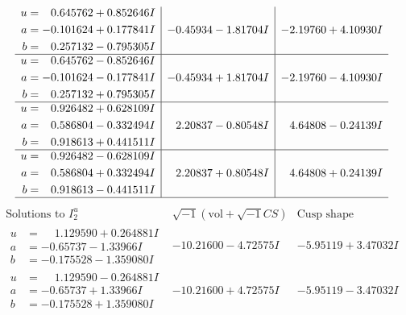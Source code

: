 \documentclass[1p]{elsarticle_modified}
\theoremstyle{definition}
\newcommand{\I}{\sqrt{-1}}
\begin{document}
$$\begin{array}{c|c|c}
\begin{aligned}
u &= \phantom{-}0.645762 + 0.852646 I \\
a &= -0.101624 + 0.177841 I \\
b &= \phantom{-}0.257132 - 0.795305 I\end{aligned}
 & -0.45934 - 1.81704 I & -2.19760 + 4.10930 I \\ \hline\begin{aligned}
u &= \phantom{-}0.645762 - 0.852646 I \\
a &= -0.101624 - 0.177841 I \\
b &= \phantom{-}0.257132 + 0.795305 I\end{aligned}
 & -0.45934 + 1.81704 I & -2.19760 - 4.10930 I \\ \hline\begin{aligned}
u &= \phantom{-}0.926482 + 0.628109 I \\
a &= \phantom{-}0.586804 - 0.332494 I \\
b &= \phantom{-}0.918613 + 0.441511 I\end{aligned}
 & \phantom{-}2.20837 - 0.80548 I & \phantom{-}4.64808 - 0.24139 I \\ \hline\begin{aligned}
u &= \phantom{-}0.926482 - 0.628109 I \\
a &= \phantom{-}0.586804 + 0.332494 I \\
b &= \phantom{-}0.918613 - 0.441511 I\end{aligned}
 & \phantom{-}2.20837 + 0.80548 I & \phantom{-}4.64808 + 0.24139 I\\
 \hline 
 \end{array}$$\newpage$$\begin{array}{c|c|c}  
\text{Solutions to }I^u_{2}& \I (\text{vol} + \sqrt{-1}CS) & \text{Cusp shape}\\
 \hline 
\begin{aligned}
u &= \phantom{-}1.129590 + 0.264881 I \\
a &= -0.65737 - 1.33966 I \\
b &= -0.175528 - 1.359080 I\end{aligned}
 & -10.21600 - 4.72575 I & -5.95119 + 3.47032 I \\ \hline\begin{aligned}
u &= \phantom{-}1.129590 - 0.264881 I \\
a &= -0.65737 + 1.33966 I \\
b &= -0.175528 + 1.359080 I\end{aligned}
 & -10.21600 + 4.72575 I & -5.95119 - 3.47032 I \\ \hline\begin{aligned}

\end{aligned}
\end{array}$$
\end{document}
